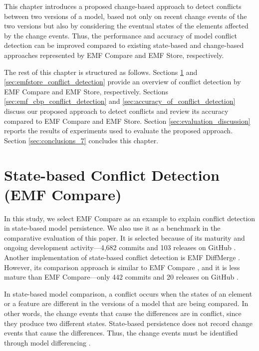 This chapter introduces a proposed change-based approach to detect conflicts between two versions of a model, based not only on recent change events of the two versions but also by considering the eventual states of the elements affected by the change events. Thus, the performance and accuracy of model conflict detection can be improved compared to existing state-based and change-based approaches represented by EMF Compare and EMF Store, respectively.

The rest of this chapter is structured as follows. Sections \ref{sec:emfcompare_conflict_detection} and \ref{sec:emfstore_conflict_detection} provide an overview of conflict detection by EMF Compare and EMF Store, respectively. Sections \ref{sec:emf_cbp_conflict_detection} and \ref{sec:accuracy_of_conflict_detection} discuss our proposed approach to detect conflicts and review its accuracy compared to EMF Compare and EMF Store. Section \ref{sec:evaluation_discussion} reports the results of experiments used to evaluate the proposed approach. Section \ref{sec:conclusions_7} concludes this chapter.

\section{State-based Conflict Detection (EMF Compare)}
\label{sec:emfcompare_conflict_detection}

In this study, we select EMF Compare \cite{emfcompare2018developer} as an example to explain conflict detection in state-based model persistence. We also use it as a benchmark in the comparative evaluation of this paper. It is selected because of its maturity and ongoing development activity—4,682 commits and 103 releases on GitHub \cite{github2019emfcompare}. Another implementation of state-based conflict detection is EMF DiffMerge \cite{eclipse2019emfdiffmerge}. However, its comparison approach is similar to EMF Compare \cite{eclipse2019emfdiffmerge}, and it is less mature than EMF Compare—only 442 commits and 20 releases on GitHub \cite{github2019emfdiffmerge}.

In state-based model comparison, a conflict occurs when the states of an element or a feature are different in the versions of a model that are being compared. In other words, the change events that cause the differences are in conflict, since they produce two different states. State-based persistence does not record change events that cause the differences. Thus, the change events must be identified through model differencing \cite{emfcompare2018developer,yohannis2019efficient}.

